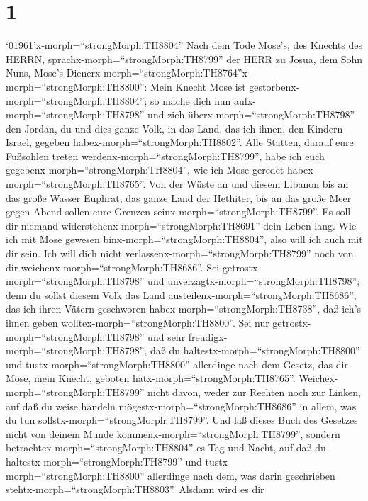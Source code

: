 \hypertarget{section}{%
\section{1}\label{section}}

 `01961'\textbar x-morph=``strongMorph:TH8804'' Nach dem
Tode Mose's, des Knechts des HERRN, sprachx-morph=``strongMorph:TH8799''
der HERR zu Josua, dem Sohn Nuns, Mose's
Dienerx-morph=``strongMorph:TH8764''x-morph=``strongMorph:TH8800'':
 Mein Knecht Mose ist
gestorbenx-morph=``strongMorph:TH8804''; so mache dich nun
aufx-morph=``strongMorph:TH8798'' und zieh
überx-morph=``strongMorph:TH8798'' den Jordan, du und dies ganze Volk,
in das Land, das ich ihnen, den Kindern Israel, gegeben
habex-morph=``strongMorph:TH8802''.  Alle Stätten, darauf
eure Fußsohlen treten werdenx-morph=``strongMorph:TH8799'', habe ich
euch gegebenx-morph=``strongMorph:TH8804'', wie ich Mose geredet
habex-morph=``strongMorph:TH8765''.  Von der Wüste an und
diesem Libanon bis an das große Wasser Euphrat, das ganze Land der
Hethiter, bis an das große Meer gegen Abend sollen eure Grenzen
seinx-morph=``strongMorph:TH8799''.  Es soll dir niemand
widerstehenx-morph=``strongMorph:TH8691'' dein Leben lang. Wie ich mit
Mose gewesen binx-morph=``strongMorph:TH8804'', also will ich auch mit
dir sein. Ich will dich nicht verlassenx-morph=``strongMorph:TH8799''
noch von dir weichenx-morph=``strongMorph:TH8686''.  Sei
getrostx-morph=``strongMorph:TH8798'' und
unverzagtx-morph=``strongMorph:TH8798''; denn du sollst diesem Volk das
Land austeilenx-morph=``strongMorph:TH8686'', das ich ihren Vätern
geschworen habex-morph=``strongMorph:TH8738'', daß ich's ihnen geben
wolltex-morph=``strongMorph:TH8800''.  Sei nur
getrostx-morph=``strongMorph:TH8798'' und sehr
freudigx-morph=``strongMorph:TH8798'', daß du
haltestx-morph=``strongMorph:TH8800'' und
tustx-morph=``strongMorph:TH8800'' allerdinge nach dem Gesetz, das dir
Mose, mein Knecht, geboten hatx-morph=``strongMorph:TH8765''.
Weichex-morph=``strongMorph:TH8799'' nicht davon, weder zur Rechten noch
zur Linken, auf daß du weise handeln
mögestx-morph=``strongMorph:TH8686'' in allem, was du tun
sollstx-morph=``strongMorph:TH8799''.  Und laß dieses Buch
des Gesetzes nicht von deinem Munde
kommenx-morph=``strongMorph:TH8799'', sondern
betrachtex-morph=``strongMorph:TH8804'' es Tag und Nacht, auf daß du
haltestx-morph=``strongMorph:TH8799'' und
tustx-morph=``strongMorph:TH8800'' allerdinge nach dem, was darin
geschrieben stehtx-morph=``strongMorph:TH8803''. Alsdann wird es dir
